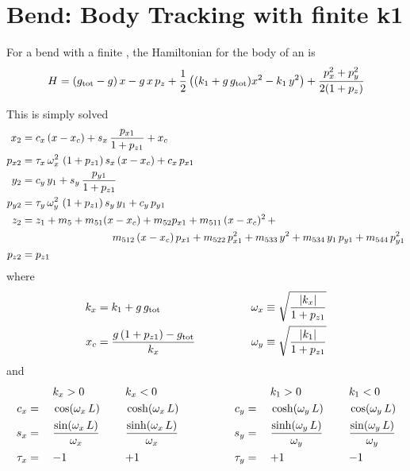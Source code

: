 \section{Bend: Body Tracking with finite k1}
\label{s:bend.body.std.k1}

For a bend with a finite , the Hamiltonian for the body of an  is
\begin{equation}
  H = (g_{\text{tot}} - g) \, x - g \, x \, p_z + 
  \frac{1}{2}\left( (k_1 + g \, g_{\text{tot}}) x^2 - k_1 \, y^2 \right) +
  \frac{p_x^2 + p_y^2}{2 (1 + p_z)} 
\end{equation}

This is simply solved
\begin{align}
  x_2    &= c_x \, (x - x_c) + s_x \, \frac{p_{x1}}{1 + p_{z1}} + x_c \CRNO
  p_{x2} &= \tau_x \, \om_x^2 \, \, (1 + p_{z1}) \, s_x \, (x -x_c) + c_x \, p_{x1} \CRNO
  y_2    &= c_y \, y_1 + s_y \, \frac{p_{y1}}{1 + p_{z1}} \CRNO
  p_{y2} &= \tau_y \, \om_y^2 \, \, (1 + p_{z1}) \, s_y \, y_1 + c_y \, p_{y1} \\
  z_2    &= z_1 + m_5 + m_{51} (x - x_c) + m_{52} p_{x1} + m_{511} \, (x-x_c)^2 \, + \CRNO
         &\hspace*{20ex} m_{512} \, (x-x_c) \, p_{x1} + m_{522} \, p_{x1}^2 + 
                         m_{533} \, y^2 + m_{534} \, y_1 \, p_{y1} + m_{544} \, p_{y1}^2 \CRNO
  p_{z2} &= p_{z1} \nonumber
\end{align}
where 
\begin{alignat}{2}
  k_x &= k_1 + g \, g_{\text{tot}} & \qquad \qquad
  \omega_x &\equiv \sqrt{\frac{|k_x|}{1 + p_{z1}}} \nonumber \\
  x_c &= \frac{g \, (1 + p_{z1}) - g_{\text{tot}}}{k_x} & \qquad \qquad
  \omega_y &\equiv \sqrt{\frac{|k_1|}{1 + p_{z1}}} 
\end{alignat}
and
\begin{alignat}{6}
         &\hspace*{3ex}  && k_x > 0          &\hspace*{3ex}& k_x < 0 & \qquad \qquad
         &\hspace*{3ex}  && k_1 > 0          &\hspace*{3ex}& k_1 < 0 \nonumber \\
     c_x &=   && \cos  (\omega_x \, L)               && \cosh (\omega_x \, L) & \qquad \qquad
     c_y &=   && \cosh (\omega_y \, L)               && \cos  (\omega_y \, L) \nonumber \\
     s_x &=   && \frac{\sin  (\omega_x \, L)}{\omega_x} && \frac{\sinh (\omega_x \, L)}{\omega_x} & \qquad \qquad
     s_y &=   && \frac{\sinh (\omega_y \, L)}{\omega_y} && \frac{\sin  (\omega_y \, L)}{\omega_y} \\
  \tau_x &=   && {-}1             && {+}1             & \qquad \qquad
  \tau_y &=   && {+}1             && {-}1             \nonumber
\end{alignat}
